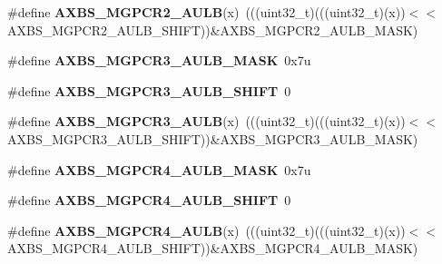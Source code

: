 \begin{DoxyCompactItemize}
\item 
\#define {\bfseries A\+X\+B\+S\+\_\+\+M\+G\+P\+C\+R2\+\_\+\+A\+U\+LB}(x)~(((uint32\+\_\+t)(((uint32\+\_\+t)(x))$<$$<$A\+X\+B\+S\+\_\+\+M\+G\+P\+C\+R2\+\_\+\+A\+U\+L\+B\+\_\+\+S\+H\+I\+FT))\&A\+X\+B\+S\+\_\+\+M\+G\+P\+C\+R2\+\_\+\+A\+U\+L\+B\+\_\+\+M\+A\+SK)\hypertarget{group__AXBS__Register__Masks_ga9047bce6c6e5493c18263bab8fc48b34}{}\label{group__AXBS__Register__Masks_ga9047bce6c6e5493c18263bab8fc48b34}

\item 
\#define {\bfseries A\+X\+B\+S\+\_\+\+M\+G\+P\+C\+R3\+\_\+\+A\+U\+L\+B\+\_\+\+M\+A\+SK}~0x7u\hypertarget{group__AXBS__Register__Masks_ga32728cb5c7a9e5bb1d40e3ae1842fa33}{}\label{group__AXBS__Register__Masks_ga32728cb5c7a9e5bb1d40e3ae1842fa33}

\item 
\#define {\bfseries A\+X\+B\+S\+\_\+\+M\+G\+P\+C\+R3\+\_\+\+A\+U\+L\+B\+\_\+\+S\+H\+I\+FT}~0\hypertarget{group__AXBS__Register__Masks_gad9320811473f8962f040b6f8bb2b2bf8}{}\label{group__AXBS__Register__Masks_gad9320811473f8962f040b6f8bb2b2bf8}

\item 
\#define {\bfseries A\+X\+B\+S\+\_\+\+M\+G\+P\+C\+R3\+\_\+\+A\+U\+LB}(x)~(((uint32\+\_\+t)(((uint32\+\_\+t)(x))$<$$<$A\+X\+B\+S\+\_\+\+M\+G\+P\+C\+R3\+\_\+\+A\+U\+L\+B\+\_\+\+S\+H\+I\+FT))\&A\+X\+B\+S\+\_\+\+M\+G\+P\+C\+R3\+\_\+\+A\+U\+L\+B\+\_\+\+M\+A\+SK)\hypertarget{group__AXBS__Register__Masks_gaa1a9d435c8f13c30b3d781dd19a71ec6}{}\label{group__AXBS__Register__Masks_gaa1a9d435c8f13c30b3d781dd19a71ec6}

\item 
\#define {\bfseries A\+X\+B\+S\+\_\+\+M\+G\+P\+C\+R4\+\_\+\+A\+U\+L\+B\+\_\+\+M\+A\+SK}~0x7u\hypertarget{group__AXBS__Register__Masks_ga0e8cb920fbcfaaefe210dedc102129d1}{}\label{group__AXBS__Register__Masks_ga0e8cb920fbcfaaefe210dedc102129d1}

\item 
\#define {\bfseries A\+X\+B\+S\+\_\+\+M\+G\+P\+C\+R4\+\_\+\+A\+U\+L\+B\+\_\+\+S\+H\+I\+FT}~0\hypertarget{group__AXBS__Register__Masks_gaf8f91ac5ba555a8dc2a1733463145139}{}\label{group__AXBS__Register__Masks_gaf8f91ac5ba555a8dc2a1733463145139}

\item 
\#define {\bfseries A\+X\+B\+S\+\_\+\+M\+G\+P\+C\+R4\+\_\+\+A\+U\+LB}(x)~(((uint32\+\_\+t)(((uint32\+\_\+t)(x))$<$$<$A\+X\+B\+S\+\_\+\+M\+G\+P\+C\+R4\+\_\+\+A\+U\+L\+B\+\_\+\+S\+H\+I\+FT))\&A\+X\+B\+S\+\_\+\+M\+G\+P\+C\+R4\+\_\+\+A\+U\+L\+B\+\_\+\+M\+A\+SK)\hypertarget{group__AXBS__Register__Masks_gaf5b88ce31357063d80980484b8236c71}{}\label{group__AXBS__Register__Masks_gaf5b88ce31357063d80980484b8236c71}


\end{DoxyCompactItemize}
